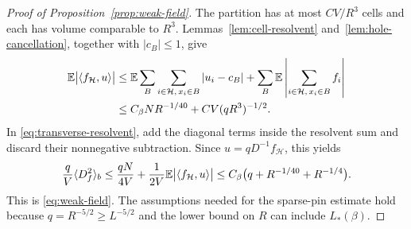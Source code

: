 \begin{proof}[Proof of Proposition~\ref{prop:weak-field}]
The partition has at most $CV/R^3$ cells and each has volume
comparable to $R^3$.  Lemmas~\ref{lem:cell-resolvent}
and~\ref{lem:hole-cancellation}, together with $|c_B|\le1$,
give
\begin{align*}
 \mathbb E\bigl|\langle f_{\mathcal H},u\rangle\bigr|
 &\le \mathbb E\sum_B\sum_{i\in\mathcal H,\,x_i\in B}|u_i-c_B|
       +\sum_B\mathbb E\left|\sum_{i\in\mathcal H,\,x_i\in B}f_i\right|\\
 &\le C_\beta N R^{-1/40}
          +CV(qR^3)^{-1/2}.
\end{align*}
In \eqref{eq:transverse-resolvent}, add the diagonal terms inside
the resolvent sum and discard their nonnegative subtraction.
Since $u=qD^{-1}f_{\mathcal H}$, this yields
\[
 \frac qV\langle D_f^2\rangle_b
 \le \frac{qN}{4V}+
       \frac1{2V}\mathbb E\bigl|\langle f_{\mathcal H},u\rangle\bigr|
 \le C_\beta\bigl(q+R^{-1/40}+R^{-1/4}\bigr).
\]
This is \eqref{eq:weak-field}.  The assumptions needed for the
sparse-pin estimate hold because $q=R^{-5/2}\ge L^{-5/2}$ and
the lower bound on $R$ can include $L_*(\beta)$.
\end{proof}
